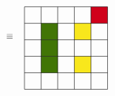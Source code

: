 \documentclass[12pt]{article}
\begin{document}
\[\begin{tikzpicture}[x=0.75pt,y=0.75pt,yscale=-1,xscale=1]
    \draw  [draw opacity=0][fill={rgb, 255:red, 208; green, 2; blue, 27 }  ,fill opacity=1 ] (330,110) -- (330,130) -- (310,130) -- (310,110) -- cycle ;
    \draw  [draw opacity=0][fill={rgb, 255:red, 248; green, 231; blue, 28 }  ,fill opacity=1 ] (310,130) -- (310,150) -- (290,150) -- (290,130) -- cycle ;
    \draw  [draw opacity=0][fill={rgb, 255:red, 248; green, 231; blue, 28 }  ,fill opacity=1 ] (310,170) -- (310,190) -- (290,190) -- (290,170) -- cycle ;
    \draw  [draw opacity=0][fill={rgb, 255:red, 65; green, 117; blue, 5 }  ,fill opacity=1 ] (270,130) -- (270,150) -- (250,150) -- (250,130) -- cycle ;
    \draw  [draw opacity=0][fill={rgb, 255:red, 65; green, 117; blue, 5 }  ,fill opacity=1 ] (270,150) -- (270,170) -- (250,170) -- (250,150) -- cycle ;
    \draw  [draw opacity=0][fill={rgb, 255:red, 65; green, 117; blue, 5 }  ,fill opacity=1 ] (270,170) -- (270,190) -- (250,190) -- (250,170) -- cycle ;
    \draw  [draw opacity=0] (330,110) -- (330,210) -- (230,210) -- (230,110) -- cycle ; \draw   (330,130) -- (230,130)(330,150) -- (230,150)(330,170) -- (230,170)(330,190) -- (230,190) ; \draw   (310,110) -- (310,210)(290,110) -- (290,210)(270,110) -- (270,210)(250,110) -- (250,210) ; \draw   (330,110) -- (330,210) -- (230,210) -- (230,110) -- cycle ;
    
    
    \draw (207,142.4) node [anchor=north west][inner sep=0.75pt]  [xscale=0.8,yscale=0.8]  {$\equiv $};
    
    
    \end{tikzpicture}
    \]
\end{document}
